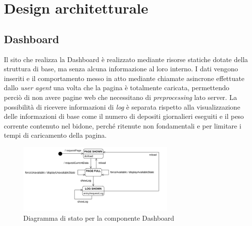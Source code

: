 \documentclass[a4paper, 12pt]{report}
\begin{document}
		\section{Design architetturale}
			\subsection{Dashboard}
			Il sito che realizza la Dashboard è realizzato mediante risorse statiche dotate
			della struttura di base, ma senza alcuna informazione al loro interno. I dati vengono inseriti e il
			comportamento messo in atto mediante chiamate asincrone effettuate dallo \textit{user agent}
			una volta che la pagina è totalmente caricata, permettendo perciò di non avere pagine web
			che necessitano di \textit{preprocessing} lato server. La possibilità di ricevere informazioni
			di \textit{log} è separata rispetto alla visualizzazione delle informazioni di base come
			il numero di depositi giornalieri eseguiti e il peso corrente contenuto nel bidone, perché
			ritenute non fondamentali e per limitare i tempi di caricamento della pagina.
			\begin{figure}[H]
				\centering
				\includegraphics[width=0.7\textwidth]{"img/DashboardStatechart"}    
				\caption{Diagramma di stato per la componente Dashboard}
			\end{figure}
\end{document}
